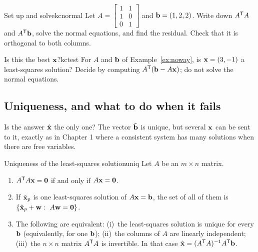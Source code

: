 \documentclass[11pt]{article}
\begin{document}
\begin{kc}{Set up and solve}{kcnormal}
Let $A=\begin{bmatrix}1&1\\1&0\\0&1\end{bmatrix}$ and $\mathbf{b}=(1,2,2)$. Write down $A^{\mathsf T} A$ and $A^{\mathsf T}\mathbf{b}$, solve the normal equations, and find the residual. Check that it is orthogonal to both columns.
\end{kc}

\begin{kc}{Is this the best $\mathbf{x}$?}{kctest}
For $A$ and $\mathbf{b}$ of Example~\ref{ex:noway}, is $\mathbf{x}=(3,-1)$ a least-squares solution? Decide by computing $A^{\mathsf T}(\mathbf{b}-A\mathbf{x})$; do not solve the normal equations.
\end{kc}

\subsection*{Uniqueness, and what to do when it fails}

Is the answer $\hat{\mathbf{x}}$ the only one? The vector $\hat{\mathbf{b}}$ is unique, but several $\mathbf{x}$ can be sent to it, exactly as in Chapter 1 where a consistent system has many solutions when there are free variables.

\begin{thm}{Uniqueness of the least-squares solution}{uniq}
Let $A$ be an $m\times n$ matrix.
\begin{enumerate}[label=(\alph*),itemsep=1pt]
  \item $A^{\mathsf T} A\mathbf{x}=\mathbf{0}$ if and only if $A\mathbf{x}=\mathbf{0}$.
  \item If $\hat{\mathbf{x}}_p$ is one least-squares solution of $A\mathbf{x}=\mathbf{b}$, the set of all of them is $\{\hat{\bv{x}}_p+\bv{w}:\ A\bv{w}=\bv{0}\}$.
  \item The following are equivalent: (i)~the least-squares solution is unique for every $\mathbf{b}$ (equivalently, for one $\mathbf{b}$); (ii)~the columns of $A$ are linearly independent; (iii)~the $n\times n$ matrix $A^{\mathsf T} A$ is invertible. In that case $\hat{\mathbf{x}}=(A^{\mathsf T} A)^{-1}A^{\mathsf T}\mathbf{b}$.
\end{enumerate}
\end{thm}
\end{document}
